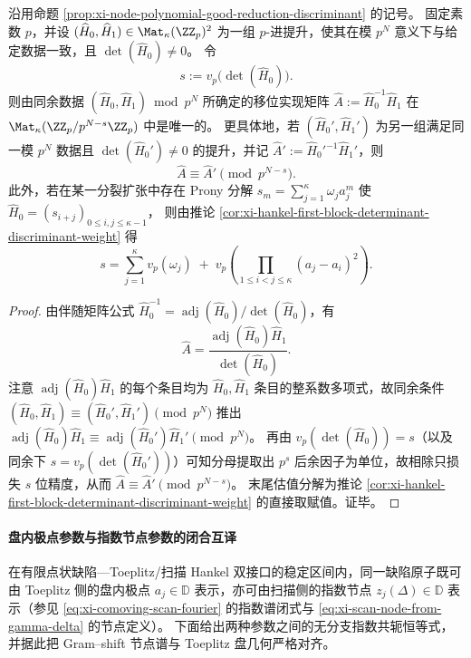 \begin{corollary}\label{cor:xi-gramshift-padic-effective-precision}
沿用命题 \ref{prop:xi-node-polynomial-good-reduction-discriminant} 的记号。
固定素数 \(p\)，并设 \((\widehat H_0,\widehat H_1)\in\Mat_\kappa(\ZZ_p)^2\) 为一组 \(p\)-进提升，使其在模 \(p^N\) 意义下与给定数据一致，且 \(\det(\widehat H_0)\ne 0\)。
令
\[
s:=v_p\!\bigl(\det(\widehat H_0)\bigr).
\]
则由同余数据 \((\widehat H_0,\widehat H_1)\bmod p^N\) 所确定的移位实现矩阵 \(\widehat A:=\widehat H_0^{-1}\widehat H_1\) 在 \(\Mat_\kappa(\ZZ_p/p^{N-s}\ZZ_p)\) 中是唯一的。
更具体地，若 \((\widehat H_0',\widehat H_1')\) 为另一组满足同一模 \(p^N\) 数据且 \(\det(\widehat H_0')\ne 0\) 的提升，并记 \(\widehat A':=\widehat H_0'^{-1}\widehat H_1'\)，则
\[
\widehat A\equiv \widehat A'\pmod{p^{N-s}}.
\]
此外，若在某一分裂扩张中存在 Prony 分解 \(s_m=\sum_{j=1}^{\kappa}\omega_j a_j^m\) 使
\(
\widehat H_0=(s_{i+j})_{0\le i,j\le \kappa-1}
\)，
则由推论 \ref{cor:xi-hankel-first-block-determinant-discriminant-weight} 得
\[
s=\sum_{j=1}^{\kappa}v_p(\omega_j)\;+\;v_p\!\left(\prod_{1\le i<j\le\kappa}(a_j-a_i)^2\right).
\]
\end{corollary}
\begin{proof}
由伴随矩阵公式
\(
\widehat H_0^{-1}=\operatorname{adj}(\widehat H_0)/\det(\widehat H_0)
\)，有
\[
\widehat A=\frac{\operatorname{adj}(\widehat H_0)\widehat H_1}{\det(\widehat H_0)}.
\]
注意 \(\operatorname{adj}(\widehat H_0)\widehat H_1\) 的每个条目均为 \(\widehat H_0,\widehat H_1\) 条目的整系数多项式，故同余条件
\(
(\widehat H_0,\widehat H_1)\equiv(\widehat H_0',\widehat H_1')\pmod{p^N}
\)
推出
\(
\operatorname{adj}(\widehat H_0)\widehat H_1\equiv \operatorname{adj}(\widehat H_0')\widehat H_1'\pmod{p^N}
\)。
再由 \(v_p(\det(\widehat H_0))=s\)（以及同余下 \(s=v_p(\det(\widehat H_0'))\)）可知分母提取出 \(p^s\) 后余因子为单位，故相除只损失 \(s\) 位精度，从而
\(
\widehat A\equiv \widehat A'\pmod{p^{N-s}}
\)。
末尾估值分解为推论 \ref{cor:xi-hankel-first-block-determinant-discriminant-weight} 的直接取赋值。证毕。
\end{proof}



\paragraph{盘内极点参数与指数节点参数的闭合互译}
在有限点状缺陷—Toeplitz/扫描 Hankel 双接口的稳定区间内，同一缺陷原子既可由 Toeplitz 侧的盘内极点 \(a_j\in\mathbb{D}\) 表示，亦可由扫描侧的指数节点 \(z_j(\Delta)\in\mathbb{D}\) 表示（参见 \eqref{eq:xi-comoving-scan-fourier} 的指数谱闭式与 \eqref{eq:xi-scan-node-from-gamma-delta} 的节点定义）。
下面给出两种参数之间的无分支指数共轭恒等式，并据此把 Gram--shift 节点谱与 Toeplitz 盘几何严格对齐。

